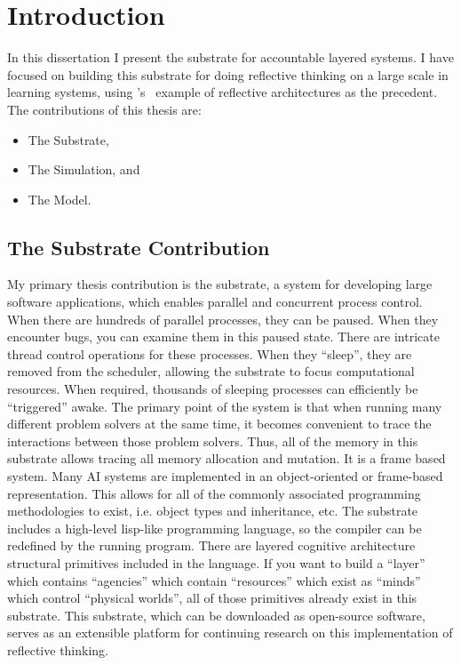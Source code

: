\chapter{Introduction}
\label{chapter:introduction}

In this dissertation I present the substrate for accountable layered
systems.  I have focused on building this substrate for doing
reflective thinking on a large scale in learning systems, using
{\mbox{\citeauthor{singh:2005}'s~\citeyearpar{singh:2005}}} example of
reflective architectures as the precedent.  The contributions of this
thesis are:

\begin{itemize}
\item The Substrate,
\item The Simulation, and
\item The Model.
\end{itemize}
  
\section{The Substrate Contribution}

My primary thesis contribution is the substrate, a system for
developing large software applications, which enables parallel and
concurrent process control.  When there are hundreds of parallel
processes, they can be paused.  When they encounter bugs, you can
examine them in this paused state.  There are intricate thread control
operations for these processes.  When they ``sleep'', they are removed
from the scheduler, allowing the substrate to focus computational
resources.  When required, thousands of sleeping processes can
efficiently be ``triggered'' awake.  The primary point of the system
is that when running many different problem solvers at the same time,
it becomes convenient to trace the interactions between those problem
solvers.  Thus, all of the memory in this substrate allows tracing all
memory allocation and mutation.  It is a frame based system.  Many AI
systems are implemented in an object-oriented or frame-based
representation.  This allows for all of the commonly associated
programming methodologies to exist, i.e.  object types and
inheritance, etc.  The substrate includes a high-level lisp-like
programming language, so the compiler can be redefined by the running
program.  There are layered cognitive architecture structural
primitives included in the language.  If you want to build a ``layer''
which contains ``agencies'' which contain ``resources'' which exist as
``minds'' which control ``physical worlds'', all of those primitives
already exist in this substrate.  This substrate, which can be
downloaded as open-source software, serves as an extensible platform
for continuing research on this implementation of reflective thinking.

